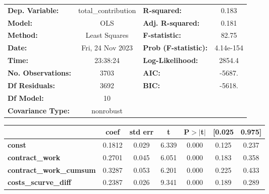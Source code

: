 \begin{center}
\begin{tabular}{lclc}
\toprule
\textbf{Dep. Variable:}                   & total\_contribution & \textbf{  R-squared:         } &     0.183   \\
\textbf{Model:}                           &         OLS         & \textbf{  Adj. R-squared:    } &     0.181   \\
\textbf{Method:}                          &    Least Squares    & \textbf{  F-statistic:       } &     82.75   \\
\textbf{Date:}                            &   Fri, 24 Nov 2023  & \textbf{  Prob (F-statistic):} & 4.14e-154   \\
\textbf{Time:}                            &       23:38:24      & \textbf{  Log-Likelihood:    } &    2854.4   \\
\textbf{No. Observations:}                &          3703       & \textbf{  AIC:               } &    -5687.   \\
\textbf{Df Residuals:}                    &          3692       & \textbf{  BIC:               } &    -5618.   \\
\textbf{Df Model:}                        &            10       & \textbf{                     } &             \\
\textbf{Covariance Type:}                 &      nonrobust      & \textbf{                     } &             \\
\bottomrule
\end{tabular}
\begin{tabular}{lcccccc}
                                          & \textbf{coef} & \textbf{std err} & \textbf{t} & \textbf{P$> |$t$|$} & \textbf{[0.025} & \textbf{0.975]}  \\
\midrule
\textbf{const}                            &       0.1812  &        0.029     &     6.339  &         0.000        &        0.125    &        0.237     \\
\textbf{contract\_work}                   &       0.2701  &        0.045     &     6.051  &         0.000        &        0.183    &        0.358     \\
\textbf{contract\_work\_cumsum}           &       0.3287  &        0.053     &     6.201  &         0.000        &        0.225    &        0.433     \\
\textbf{costs\_scurve\_diff}              &       0.2387  &        0.026     &     9.341  &         0.000        &        0.189    &        0.289     \\

\end{tabular}
\end{center}
